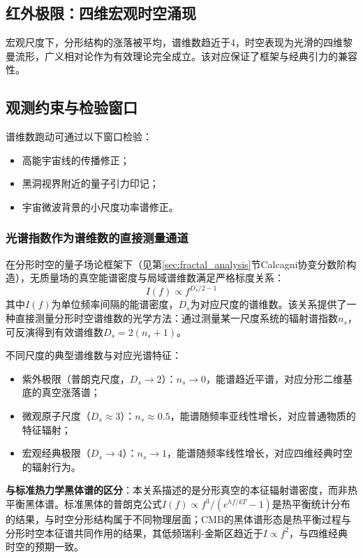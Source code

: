 \documentclass[12pt,a4paper,twocolumn]{article}
\begin{document}
\subsection{红外极限：四维宏观时空涌现}
宏观尺度下，分形结构的涨落被平均，谱维数趋近于4，时空表现为光滑的四维黎曼流形，广义相对论作为有效理论完全成立。该对应保证了框架与经典引力的兼容性。

\subsection{观测约束与检验窗口}
谱维数跑动可通过以下窗口检验：
\begin{itemize}
\item 高能宇宙线的传播修正；
\item 黑洞视界附近的量子引力印记；
\item 宇宙微波背景的小尺度功率谱修正。
\end{itemize}

\subsubsection{光谱指数作为谱维数的直接测量通道}
\label{subsec:spectral_index_measurement}
在分形时空的量子场论框架下（见第\ref{sec:fractal_analysis}节Calcagni协变分数阶构造），无质量场的真空能谱密度与局域谱维数满足严格标度关系：
\begin{equation}
I(f) \propto f^{D_s / 2 - 1}
\end{equation}
其中$I(f)$为单位频率间隔的能谱密度，$D_s$为对应尺度的谱维数。该关系提供了一种直接测量分形时空谱维数的光学方法：通过测量某一尺度系统的辐射谱指数$n_s$，可反演得到有效谱维数$D_s = 2(n_s + 1)$。

不同尺度的典型谱维数与对应光谱特征：
\begin{itemize}
\item 紫外极限（普朗克尺度，$D_s \to 2$）：$n_s \to 0$，能谱趋近平谱，对应分形二维基底的真空涨落谱；
\item 微观原子尺度（$D_s \approx 3$）：$n_s \approx 0.5$，能谱随频率亚线性增长，对应普通物质的特征辐射；
\item 宏观经典极限（$D_s \to 4$）：$n_s \to 1$，能谱随频率线性增长，对应四维经典时空的辐射行为。
\end{itemize}

\textbf{与标准热力学黑体谱的区分}：本关系描述的是分形真空的本征辐射谱密度，而非热平衡黑体谱。标准黑体的普朗克公式$I(f) \propto f^3/(e^{hf/kT}-1)$是热平衡统计分布的结果，与时空分形结构属于不同物理层面；CMB的黑体谱形态是热平衡过程与分形时空本征谱共同作用的结果，其低频瑞利-金斯区趋近于$I\propto f^2$，与四维经典时空的预期一致。
\end{document}
